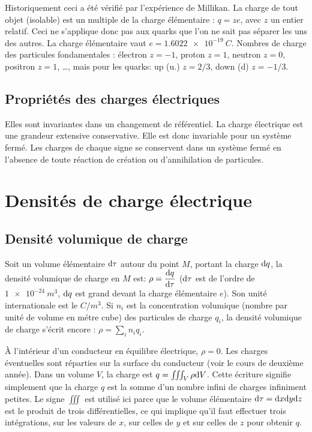 Historiquement ceci a été vérifié par l'expérience de Millikan. La charge de 
tout objet (isolable) est un multiple de la charge élémentaire : \(q = z e\), 
avec \(z\) un entier relatif. Ceci ne s'applique donc pas aux quarks que l'on 
ne sait pas séparer les uns des autres. La charge élémentaire vaut \(e = 
\SI{1,6022e-19}{C}\).
Nombres de charge des particules fondamentales : électron \(z = -1\), proton 
\(z = 1\), neutron \(z = 0\), positron \(z = 1\), \dots,  mais pour les quarks: 
up (u.) \(z = 2/3\), down (d) \(z = -1/3\).

\subsection{Propriétés des charges électriques}%
\label{chap9-subsec:proprietesdeschargeselectriques}%

Elles sont invariantes dans un changement de référentiel. La charge électrique 
est une grandeur extensive conservative. Elle est donc invariable pour un 
système fermé. Les charges de chaque signe se conservent dans un système fermé 
en l'absence de toute réaction de création ou d'annihilation de particules.

\section{Densités de charge électrique}%
\label{chap9-sec:densitesdechargeelectrique}%

\subsection{Densité volumique de charge}%
\label{chap9-subsec:densitevolumiquedecharge}%

Soit un volume élémentaire \(\mathrm{d}\tau\) autour du point \(M\), portant la charge 
\(\mathrm{d} q\), la densité volumique de charge en \(M\) est: \(\rho = 
\dfrac{\mathrm{d} q}{\mathrm{d} \tau}\) (\(\mathrm{d}\tau\) est de l'ordre de \(\SI{1e-24}{m^3}\), \(\mathrm{d} q\) 
est grand devant la charge élémentaire \(e\)). Son unité internationale est le 
\(\si{C/m^3}\). Si \(n_i\) est la concentration volumique (nombre par unité de 
volume en métre cube) des particules de charge \(q_i\), la densité volumique de 
charge s'écrit encore : \(\rho = \sum_i n_i q_i\).

À l'intérieur d'un conducteur en équilibre électrique, \(\rho = 0\). Les 
charges éventuelles sont réparties sur la surface du conducteur (voir le cours 
de deuxième année). Dans un volume \(V\), la charge est \(q=\iiint_V \rho \mathrm{d} 
V\). Cette écriture signifie simplement que la charge \(q\) est la somme d'un 
nombre infini de charges infiniment petites. Le signe \(\iiint\) est utilisé 
ici parce que le volume élémentaire \(\mathrm{d}\tau = \mathrm{d} x \mathrm{d} y \mathrm{d} z\) est le produit 
de trois différentielles, ce qui implique qu'il faut effectuer trois 
intégrations, sur les valeurs de \(x\), sur celles de \(y\) et sur celles de 
\(z\) pour obtenir \(q\).

